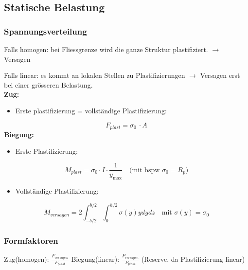     \subsection{Statische Belastung}
        \begin{comment}
            \subsubsection{Kraft- \& Deformationsgesteurete Belastung:}
            $\frac{\varepsilon_b}{\varepsilon_0}$ Deformationsgesteurete Belastung. Bsp vorgespannte Schraube, therm Spannungen. Begrenzung weniger konservativ $\sigma\varepsilon$-Diagramm gr Dehnung führt zu nur kl Spannungserhöhung).\\ $\frac{\sigma_B}{\sigma_0}$ Kraftgesteuerte Belastung. (Für viele Metalle $\frac{\varepsilon_b}{\varepsilon_0} \gg \frac{\sigma_B}{\sigma_0}$) Überschreiten $R_{p0.2}$ weniger Reserve.
        \end{comment}
        \subsubsection{Spannungsverteilung}
            Falls homogen: bei Fliessgrenze wird die ganze Struktur plastifiziert. $\rightarrow$ Versagen %
              
            Falls linear: es kommt an lokalen Stellen zu Plastifizierungen $\rightarrow$ Versagen erst bei einer grösseren Belastung.\\
            \textbf{Zug:}
            \begin{itemize}
                \item Erste plastifizierung = vollständige Plastifizierung:
            \end{itemize}
                    \[F_{plast} = \sigma_0\ \cdot A\]
            \textbf{Biegung:}
            \begin{itemize}
                \item Erste Plastifizierung:
            \end{itemize}
            \[M_{plast} = \sigma_0\cdot I\cdot\frac{1}{y_{\textrm{max}}} \quad\textrm{(mit bspw $\sigma_0 = R_p$)}\]
            \begin{itemize}
                \item Vollständige Plastifizierung:
            \end{itemize}
            \[M_{versagen} = 2\int_{-b/2}^{b/2}\int_{0}^{h/2}\sigma(y)ydydz \quad\textrm{mit $\sigma(y) = \sigma_0$}\]
        \subsubsection{Formfaktoren}
            Zug(homogen): $\frac{F_{versagen}}{F_{plast}}$
            Biegung(linear): $\frac{P_{versagen}}{P_{plast}}$ (Reserve, da Plastifizierung linear)